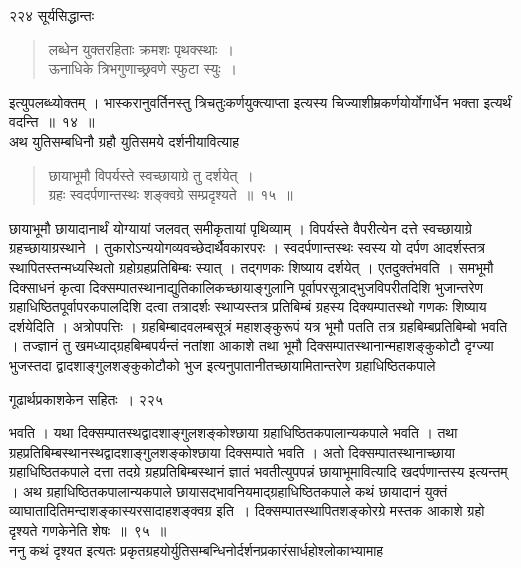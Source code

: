 \documentclass[11pt, openany]{book}
\begin{document}
\noindent २२४ \hspace{4cm} सूर्यसिद्धान्तः

\begin{quote}
{\qt लब्धेन युक्तरहिताः क्रमशः पृथक्स्थाः~।\\
 ऊनाधिके त्रिभगुणाच्छ्रवणे स्फुटा स्युः~। }
 \end{quote}


इत्युपलब्ध्योक्तम् । भास्करानुवर्तिनस्तु त्रिचतुःकर्णयुक्त्याप्ता इत्यस्य चिज्याशीम्रकर्णयोर्योगार्धेन भक्ता इत्यर्थं वदन्ति~॥~१४~॥\\
\noindent अथ युतिसम्बधिनौ ग्रहौ युतिसमये दर्शनीयावित्याह \textendash


\begin{quote}
{\ssi छायाभूमौ विपर्यस्ते स्वच्छायाग्रे तु दर्शयेत्~।\\
 ग्रहः स्वदर्पणान्तस्थः शङ्क्वग्रे सम्प्रदृश्यते~॥~१५~॥ }
\end{quote}


 छायाभूमौ छायादानार्थं योग्यायां जलवत् समीकृतायां पृथिव्याम् । विपर्यस्ते वैपरीत्येन दत्ते स्वच्छायाग्रे ग्रहच्छायाग्रस्थाने । तुकारोऽन्ययोगव्यवच्छेदार्थैवकारपरः । स्वदर्पणान्तस्थः स्वस्य यो दर्पण आदर्शस्तत्र स्थापितस्तन्मध्यस्थितो ग्रहोग्रहप्रतिबिम्बः स्यात् । तद्गणकः शिष्याय दर्शयेत् । एतदुक्तंभवति । समभूमौ दिक्साधनं कृत्वा दिक्सम्पातस्थानाद्युतिकालिकच्छायाङ्गुलानि पूर्वापरसूत्राद्भुजविपरीतदिशि भुजान्तरेण ग्रहाधिष्ठितपूर्वापरकपालदिशि दत्वा तत्रादर्शः स्थाप्यस्तत्र प्रतिबिम्बं ग्रहस्य दिक्यम्पातस्थो गणकः शिष्याय दर्शयेदिति । अत्रोपपत्तिः । ग्रहबिम्बादवलम्बसूत्रं महाशङ्कुरूपं यत्र भूमौ पतति तत्र ग्रहबिम्बप्रतिबिम्बो भवति । तज्ज्ञानं तु खमध्याद्ग्रहबिम्बपर्यन्तं नतांशा आकाशे तथा भूमौ दिक्सम्पातस्थानान्महाशङ्कुकोटौ दृग्ज्या भुजस्तदा द्वादशाङ्गुलशङ्कुकोटौको भुज इत्यनुपातानीतच्छायामितान्तरेण ग्रहाधिष्ठितकपाले


\newpage

\hspace{3cm} गूढार्थप्रकाशकेन सहितः~। \hfill २२५
\vspace{1cm}


\noindent भवति । यथा दिक्सम्पातस्थद्वादशाङ्गुलशङ्कोश्छाया ग्रहाधिष्ठितकपालान्यकपाले भवति । तथा ग्रहप्रतिबिम्बस्थानस्थद्वादशाङ्गुलशङ्कोश्छाया दिक्सम्पाते भवति । अतो दिक्सम्पातस्थानाच्छाया ग्रहाधिष्ठितकपाले दत्ता तदग्रे ग्रहप्रतिबिम्बस्थानं ज्ञातं भवतीत्युपपन्नं छायाभूमावित्यादि खदर्पणान्तस्य इत्यन्तम् । अथ ग्रहाधिष्ठितकपालान्यकपाले छायासद्भावनियमाद्ग्रहाधिष्ठितकपाले कथं छायादानं युक्तं व्याघातादितिमन्दाशङ्कास्यरसादाह\textendash शङ्क्वग्र इति~। दिक्सम्पातस्थापितशङ्कोरग्रे मस्तक आकाशे ग्रहो दृश्यते गणकेनेति शेषः~॥~९५~॥\\
\noindent ननु कथं दृश्यत इत्यतः प्रकृतग्रहयोर्युतिसम्बन्धिनोर्दर्शनप्रकारंसार्धहोश्लोकाभ्यामाह \textendash
\end{document}
